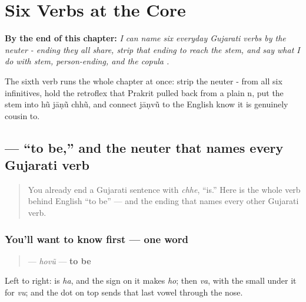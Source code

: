 
\chapter{Six Verbs at the Core}
\label{ch:gu-core-verbs}

\begin{chapteropening}
\textbf{By the end of this chapter:} \emph{I can name six everyday Gujarati verbs by the neuter - ending they all share, strip that ending to reach the stem, and say what I do with stem, person-ending, and the copula .}

The sixth verb runs the whole chapter at once: strip the neuter - from all six infinitives, hold the retroflex  that Prakrit pulled back from a plain n, put the stem into hũ jāṇũ chhũ, and connect jāṇvũ to the English know it is genuinely cousin to.
\end{chapteropening}

\section[hovũ]{ — \textquotedblleft{}to be,\textquotedblright{} and the neuter that names every Gujarati verb}

\label{lesson:GU-C07-hovun}



\begin{quote}
You already end a Gujarati sentence with \textbf{} \emph{chhe}, \textquotedblleft{}is.\textquotedblright{} Here is the whole verb behind English \textquotedblleft{}to be\textquotedblright{} — and the ending that names every other Gujarati verb.
\end{quote}

\subsection*{You'll want to know first — one word}
\begin{quote}
\textbf{} — \emph{hovũ} — \textbf{to be}
\end{quote}

Left to right: \textbf{} is \emph{ha}, and the sign \textbf{} on it makes \emph{ho}; then \textbf{} \emph{va}, with the small \textbf{} under it for \emph{vu}; and the dot \textbf{} on top sends that last vowel through the nose.


